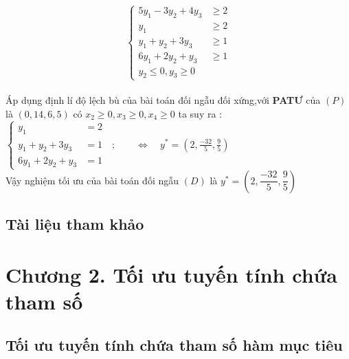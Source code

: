 \documentclass{article}
\begin{document}
\[\left\{\begin{aligned}
5y_1-3y_2+4y_3&\geq2 \\
y_1&\geq2 \\
y_1+y_2+3y_3&\geq1 \\
6y_1+2y_2+y_3&\geq1 \\
y_2\leq 0,y_3\geq 0
\end{aligned}\right.\]\\

Áp dụng định lí độ lệch bù của bài toán đối ngẫu đối xứng,với \textbf{PATƯ} của $\left(P\right)$ là 
$\left(0,14,6,5\right)$ có $x_2\geq 0,x_3\geq 0,x_4\geq 0$ ta suy ra :$\left\{\begin{aligned} 
y_1&=2 \\
y_1+y_2+3y_3&=1\quad;\qquad  \Longleftrightarrow \quad y^*=\left(2,\frac{-32}{5},\frac{9}{5}\right)\\
6y_1+2y_2+y_3&=1 
\end{aligned}\right.$\\

Vậy nghiệm tối ưu của bài toán đối ngẫu $\left(D\right)$ là $y^*=\left(2,\dfrac{-32}{5},\dfrac{9}{5}\right)$

\subsection{Tài liệu tham khảo}


\cleardoublepage
\section*{Chương 2. Tối ưu tuyến tính chứa tham số}
\subsection{Tối ưu tuyến tính chứa tham số hàm mục tiêu}



           
\end{document}
